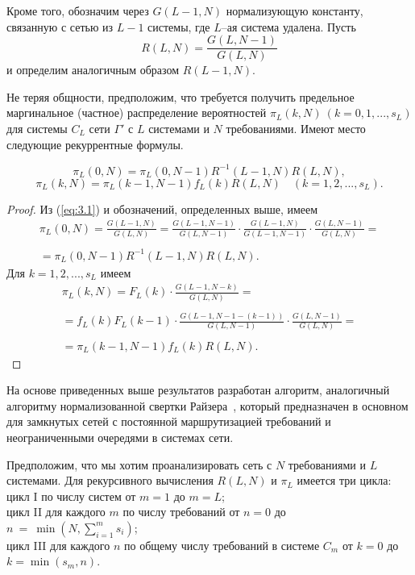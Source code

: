 Кроме того, обозначим через $G(L-1,N)$ нормализующую константу, связанную с сетью из $L-1$ системы, где $L$--ая система удалена. Пусть
\begin{equation*}
R(L,N) = \frac{G(L,N-1)}{G(L,N)}
\end{equation*}
и определим аналогичным образом $R(L-1,N)$.

Не теряя общности, предположим, что требуется получить предельное маргинальное (частное) распределение вероятностей $\pi_L(k,N)~(k=0,1,...,s_L)$ для системы $C_L$ сети $\Gamma'$ с $L$ системами и $N$ требованиями. Имеют место следующие рекуррентные формулы.

\begin{proposition}
 \begin{equation}
  \pi_L(0,N) = \pi_L(0,N-1) R^{-1}(L-1,N) R(L,N) ,
  \label{eq:3.2}
 \end{equation}
 \begin{equation}
  \pi_L(k,N) = \pi_L(k-1,N-1) f_L(k) R(L,N) \quad (k=1,2,...,s_L) .
  \label{eq:3.3}
 \end{equation}
\end{proposition}

\begin{proof}
 Из (\ref{eq:3.1}) и обозначений, определенных выше, имеем
 \begin{multline*}
  \pi_L(0,N) = \frac{G(L-1,N)}{G(L,N)} = \frac{G(L-1,N-1)}{G(L,N-1)} \cdot \frac{G(L-1,N)}{G(L-1,N-1)} \cdot
  \frac{G(L,N-1)}{G(L,N)} = \\ \\
  = \pi_L(0,N-1) R^{-1}(L-1,N) R(L,N) .
 \end{multline*}
 Для $k=1,2,...,s_L$ имеем
  \begin{multline*}
  \pi_L(k,N) = F_L(k) \cdot \frac{G(L-1,N-k)}{G(L,N)} = \\ \\
  = f_L(k) F_L(k-1) \cdot \frac{G(L-1,N-1-(k-1))}{G(L,N-1)} \cdot \frac{G(L,N-1)}{G(L,N)} = \\ \\
  = \pi_L(k-1,N-1) f_L(k) R(L,N) .
 \end{multline*}
\end{proof}

На основе приведенных выше результатов разработан алгоритм, аналогичный алгоритму нормализованной свертки Райзера~\cite{reiser}, который предназначен в основном для замкнутых сетей с постоянной маршрутизацией требований и неограниченными очередями в системах сети.

Предположим, что мы хотим проанализировать сеть с $N$ требованиями и $L$ системами. Для рекурсивного вычисления $R(L,N)$ и $\pi_L$ имеется три цикла: \\
цикл I по числу систем от $m=1$ до $m=L$; \\
цикл II для каждого $m$ по числу требований от $n=0$ до $n~=~\min(N, \sum\limits_{i=1}^m s_i)$; \\
цикл III для каждого $n$ по общему числу требований в системе $C_m$ от $k=0$ до $k=\min(s_m,n)$.

